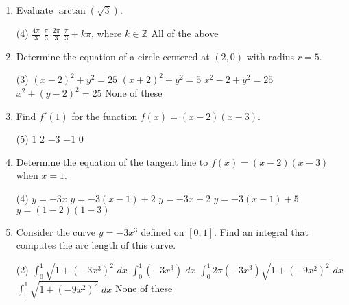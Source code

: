 \documentclass{article}
\begin{document}
\begin{enumerate}
\newpage 
\item Evaluate \( \arctan(\sqrt{3}) \).
   \begin{tasks}[label=(\alph*),label-width=2em](4)
    \task \(\displaystyle \frac{4\pi}{3}\)
    \task \(\displaystyle \frac{\pi}{3}\)  %
    \task \(\displaystyle \frac{2\pi}{3}\)
    \task \(\displaystyle \frac{\pi}{3}+k\pi\), where \(k \in \mathbb{Z}\)
    \task All of the above
  \end{tasks} \vfill


\item Determine the equation of a circle centered at \((2,0)\) with radius \(r=5\).
   \begin{tasks}[label=(\alph*),label-width=2em](3)
    \task \((x-2)^2 + y^2 = 25\) %
    \task \((x+2)^2 + y^2 = 5\)
    \task \(x^2-2 + y^2 = 25\)
    \task \(x^2 + (y-2)^2 = 25\)
    \task None of these
  \end{tasks} \vfill

\item Find \( f'(1) \) for the function \(f(x) = (x-2)(x-3) \).
   \begin{tasks}[label=(\alph*),label-width=2em](5)
    \task \(1\)
    \task \(2\)
    \task \(-3\) %
    \task \(-1\)    
    \task \(0\)
  \end{tasks} \vfill

\item Determine the equation of the tangent line to \(f(x) = (x-2)(x-3) \) when \(x=1\). 
   \begin{tasks}[label=(\alph*),label-width=2em](4)
    \task \(y= -3x\)
    \task \(y= -3(x-1)+2\) %
    \task \(y= -3x+2\)
    \task \(y= -3(x-1)+5\) 
    \task \(y=(1-2)(1-3)\)
  \end{tasks} \vfill


\item Consider the curve \(y=-3x^3\) defined on \([0,1]\). Find an integral that computes the arc length of this curve.
   \begin{tasks}[label=(\alph*),label-width=2em](2)
    \task \(\displaystyle \int_0^1 \sqrt{1+(-3x^3)^2} \; dx \)
    \task \(\displaystyle \int_0^1 (-3x^3) \; dx \)
    \task \(\displaystyle \int_0^1 2\pi (-3x^3) \sqrt{1+(-9x^2)^2} \; dx \) 
    \task \(\displaystyle \int_0^1 \sqrt{1+(-9x^2)^2} \; dx \)  %
    \task None of these
  \end{tasks} \vfill

% 
    
\end{enumerate}
\end{document}
